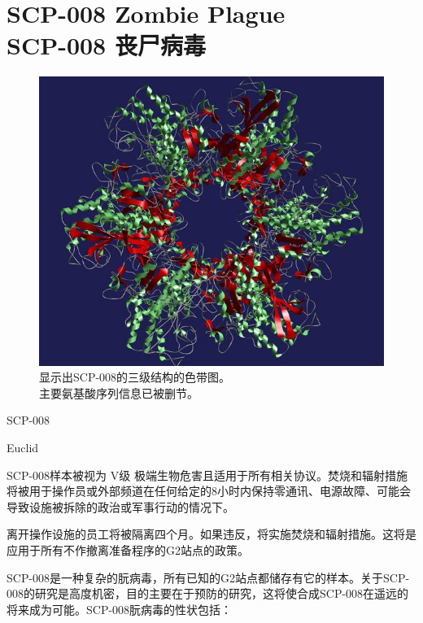 \chapter[SCP-008 丧尸病毒]{
	SCP-008 Zombie Plague\\
	SCP-008 丧尸病毒
}

\label{chap:SCP-008}

\begin{scpbox}




\end{scpbox}


\begin{figure}[H]
	\centering
	\includegraphics[width=0.5\linewidth]{images/SCP.008.jpg}
	\caption*{显示出SCP-008的三级结构的色带图。\\主要氨基酸序列信息已被删节。}
\end{figure}

SCP-008

Euclid

SCP-008样本被视为 V级 极端生物危害且适用于所有相关协议。焚烧和辐射措施将被用于操作员或外部频道在任何给定的8小时内保持零通讯、电源故障、可能会导致设施被拆除的政治或军事行动的情况下。

离开操作设施的员工将被隔离四个月。如果违反，将实施焚烧和辐射措施。这将是应用于所有不作撤离准备程序的G2站点的政策。

SCP-008是一种复杂的朊病毒，所有已知的G2站点都储存有它的样本。关于SCP-008的研究是高度机密，目的主要在于预防的研究，这将使合成SCP-008在遥远的将来成为可能。SCP-008朊病毒的性状包括：

